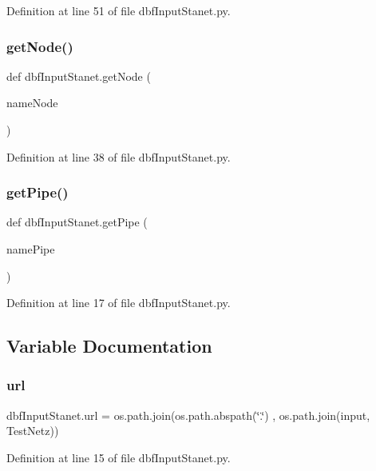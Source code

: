 Definition at line 51 of file dbf\+Input\+Stanet.\+py.

\mbox{\label{namespacedbf_input_stanet_a1df8b485c2384b611f5ec1c3eb97653b}} 
\subsubsection{\texorpdfstring{get\+Node()}{getNode()}}
{\footnotesize\ttfamily def dbf\+Input\+Stanet.\+get\+Node (\begin{DoxyParamCaption}\item[{}]{name\+Node }\end{DoxyParamCaption})}



Definition at line 38 of file dbf\+Input\+Stanet.\+py.

\mbox{\label{namespacedbf_input_stanet_a33ccd8626c4dfbd223fa22ae27efdd8d}} 
\subsubsection{\texorpdfstring{get\+Pipe()}{getPipe()}}
{\footnotesize\ttfamily def dbf\+Input\+Stanet.\+get\+Pipe (\begin{DoxyParamCaption}\item[{}]{name\+Pipe }\end{DoxyParamCaption})}



Definition at line 17 of file dbf\+Input\+Stanet.\+py.



\subsection{Variable Documentation}
\mbox{\label{namespacedbf_input_stanet_af54a8f3f60e0d2930e153f8cdcc7d5d6}} 
\subsubsection{\texorpdfstring{url}{url}}
{\footnotesize\ttfamily dbf\+Input\+Stanet.\+url = os.\+path.\+join(os.\+path.\+abspath(\char`\"{}.\char`\"{}) , os.\+path.\+join(\textquotesingle{}input\textquotesingle{}, \textquotesingle{}Test\+Netz\textquotesingle{}))}



Definition at line 15 of file dbf\+Input\+Stanet.\+py.

